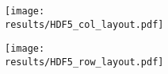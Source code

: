 \documentclass{article}
\begin{document}
\newcommand{\results}{../../simulations/timings/pics}

\begin{figure}[btp]
    \begin{subfigure}[b]{0.49\textwidth}
        \texttt{[image: \\results/HDF5\_col\_layout.pdf]}
        \caption{}
    \end{subfigure}
    \begin{subfigure}[b]{0.49\textwidth}
        \texttt{[image: \\results/HDF5\_row\_layout.pdf]}
        \caption{}
    \end{subfigure}
\end{figure}
\end{document}
